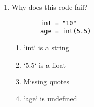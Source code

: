 \documentclass{article}
\begin{document}
\begin{enumerate}
        \item Why does this code fail?
        \begin{lstlisting}
        int = "10"
        age = int(5.5)
        \end{lstlisting}
        \begin{enumerate}[label=(\Alph*)]
            \item `int` is a string
            \item `5.5` is a float
            \item Missing quotes
            \item `age` is undefined
        \end{enumerate}
    \end{enumerate}
\end{document}
